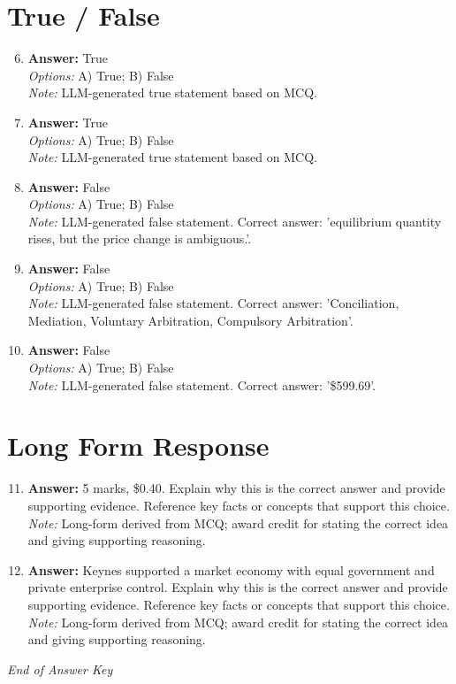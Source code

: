 \documentclass[12pt]{article}
\begin{document}
\section*{True / False}
\begin{enumerate}[label=\arabic*.]
\setcounter{enumi}{5}
\item \textbf{Answer:} True
\\ \textit{Options:} A) True; B) False
\\ \textit{Note:} LLM-generated true statement based on MCQ.
\item \textbf{Answer:} True
\\ \textit{Options:} A) True; B) False
\\ \textit{Note:} LLM-generated true statement based on MCQ.
\item \textbf{Answer:} False
\\ \textit{Options:} A) True; B) False
\\ \textit{Note:} LLM-generated false statement. Correct answer: 'equilibrium quantity rises, but the price change is ambiguous.'.
\item \textbf{Answer:} False
\\ \textit{Options:} A) True; B) False
\\ \textit{Note:} LLM-generated false statement. Correct answer: 'Conciliation, Mediation, Voluntary Arbitration, Compulsory Arbitration'.
\item \textbf{Answer:} False
\\ \textit{Options:} A) True; B) False
\\ \textit{Note:} LLM-generated false statement. Correct answer: '\$599.69'.
\end{enumerate}

\section*{Long Form Response}
\begin{enumerate}[label=\arabic*.]
\setcounter{enumi}{10}
\item \textbf{Answer:} 5 marks, \$0.40. Explain why this is the correct answer and provide supporting evidence. Reference key facts or concepts that support this choice.
\\ \textit{Note:} Long-form derived from MCQ; award credit for stating the correct idea and giving supporting reasoning.
\item \textbf{Answer:} Keynes supported a market economy with equal government and private enterprise control. Explain why this is the correct answer and provide supporting evidence. Reference key facts or concepts that support this choice.
\\ \textit{Note:} Long-form derived from MCQ; award credit for stating the correct idea and giving supporting reasoning.
\end{enumerate}

\vfill
\noindent\textit{End of Answer Key}
\end{document}
